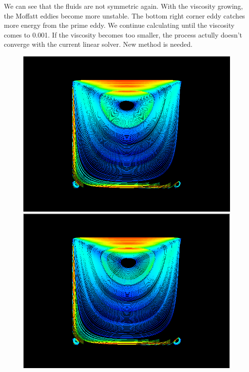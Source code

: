 \documentclass[a4paper]{article}
\begin{document}
We can see that the fluids are not
symmetric again. With the viscosity growing, the Moffatt eddies become
more unstable. The bottom right corner eddy catches more energy from
the prime eddy. We continue calculating until the viscosity comes to
0.001. If the viscosity becomes too smaller, the process actully doesn't
converge with the current linear solver. New method is needed.

\begin{figure}[h]
\centering
\includegraphics[scale = 0.2]{images/a.png}
\includegraphics[scale = 0.2]{images/b.png}

\end{figure}
\end{document}
